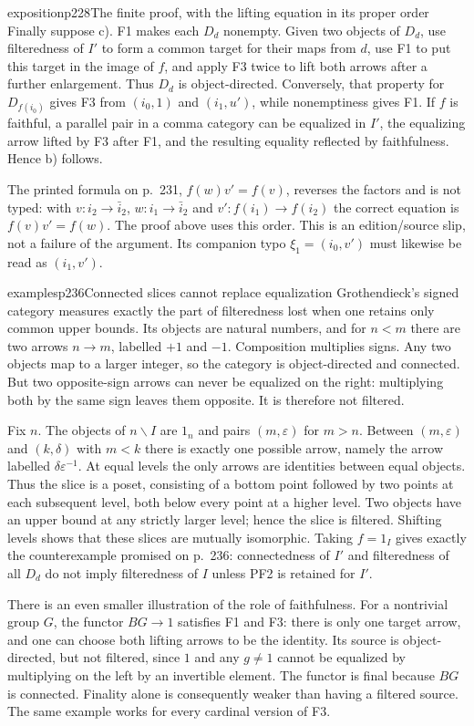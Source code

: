 \begin{dcomment}{exposition}{p228}{The finite proof, with the lifting equation in its proper order}
Finally suppose c).  F1 makes each $D_d$ nonempty.  Given two objects of $D_d$, use filteredness of $I'$ to form a common target for their maps from $d$, use F1 to put this target in the image of $f$, and apply F3 twice to lift both arrows after a further enlargement.  Thus $D_d$ is object-directed.  Conversely, that property for $D_{f(i_0)}$ gives F3 from $(i_0,1)$ and $(i_1,u')$, while nonemptiness gives F1.  If $f$ is faithful, a parallel pair in a comma category can be equalized in $I'$, the equalizing arrow lifted by F3 after F1, and the resulting equality reflected by faithfulness.  Hence b) follows.

The printed formula on p.~231, $f(w)v'=f(v)$, reverses the factors and is not typed: with $v:i_2\to\bar i_2$, $w:i_1\to\bar i_2$ and $v':f(i_1)\to f(i_2)$ the correct equation is $f(v)v'=f(w)$.  The proof above uses this order.  This is an edition/source slip, not a failure of the argument.  Its companion typo $\xi_1=(i_0,v')$ must likewise be read as $(i_1,v')$.
\end{dcomment}

\begin{dcomment}{examples}{p236}{Connected slices cannot replace equalization}
Grothendieck's signed category measures exactly the part of filteredness lost when one retains only common upper bounds.  Its objects are natural numbers, and for $n<m$ there are two arrows $n\to m$, labelled $+1$ and $-1$.  Composition multiplies signs.  Any two objects map to a larger integer, so the category is object-directed and connected.  But two opposite-sign arrows can never be equalized on the right: multiplying both by the same sign leaves them opposite.  It is therefore not filtered.

Fix $n$.  The objects of $n\backslash I$ are $1_n$ and pairs $(m,\varepsilon)$ for $m>n$.  Between $(m,\varepsilon)$ and $(k,\delta)$ with $m<k$ there is exactly one possible arrow, namely the arrow labelled $\delta\varepsilon^{-1}$.  At equal levels the only arrows are identities between equal objects.  Thus the slice is a poset, consisting of a bottom point followed by two points at each subsequent level, both below every point at a higher level.  Two objects have an upper bound at any strictly larger level; hence the slice is filtered.  Shifting levels shows that these slices are mutually isomorphic.  Taking $f=1_I$ gives exactly the counterexample promised on p.~236: connectedness of $I'$ and filteredness of all $D_d$ do not imply filteredness of $I$ unless PF2 is retained for $I'$.

There is an even smaller illustration of the role of faithfulness.  For a nontrivial group $G$, the functor $BG\to1$ satisfies F1 and F3: there is only one target arrow, and one can choose both lifting arrows to be the identity.  Its source is object-directed, but not filtered, since $1$ and any $g\ne1$ cannot be equalized by multiplying on the left by an invertible element.  The functor is final because $BG$ is connected.  Finality alone is consequently weaker than having a filtered source.  The same example works for every cardinal version of F3.
\end{dcomment}

